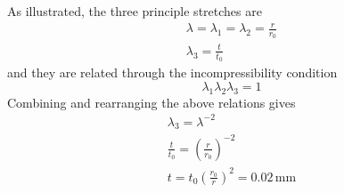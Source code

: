 \documentclass[11pt]{article}
\begin{document}
\begin{enumerate}
As illustrated, the three principle stretches are
\begin{gather*}
\lambda = \lambda_1 = \lambda_2 = \frac{r}{r_0}\\
\lambda_3 = \frac{t}{t_0}
\end{gather*}
and they are related through the incompressibility condition
\begin{equation*}
\lambda_1 \lambda_2 \lambda_3 = 1
\end{equation*}
Combining and rearranging the above relations gives
\begin{gather*}
\lambda_3 = \lambda^{-2}\\
\frac{t}{t_0} = \left(\frac{r}{r_0}\right)^{-2}\\
t = t_0\left(\frac{r_0}{r}\right)^2 = 0.02\, \text{mm}
\end{gather*}


\end{enumerate}
\end{document}
